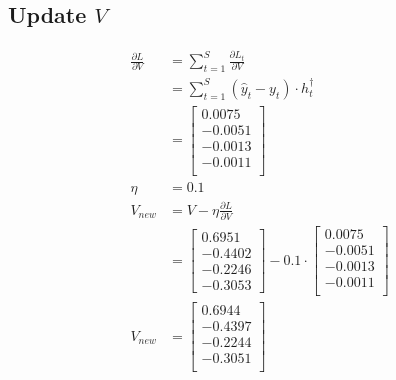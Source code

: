 \documentclass{article}
\begin{document}
\subsection{Update $V$}
\begin{align*} 
\frac{\partial L}{\partial V} &= \sum_{t=1}^{S} \frac{\partial L_{t}}{\partial V} \\
&=\sum_{t=1}^{S} (\hat{y}_{t} - y_{t}) \cdot h_{t}^\dagger\\
&= \begin{bmatrix}
0.0075\\
-0.0051\\
-0.0013\\
-0.0011\\
\end{bmatrix}\\
\eta &= 0.1\\
V_{new} &= V - \eta \frac{\partial L}{\partial V}\\
 &= \begin{bmatrix}
  0.6951 \\
 -0.4402 \\
 -0.2246 \\
 -0.3053
\end{bmatrix} - 0.1 \cdot\begin{bmatrix}
    0.0075\\
-0.0051\\
-0.0013\\
-0.0011\\
\end{bmatrix} \\
V_{new} &= \begin{bmatrix}
0.6944\\
-0.4397\\
-0.2244\\
-0.3051\\
\end{bmatrix}
\end{align*}
\end{document}
